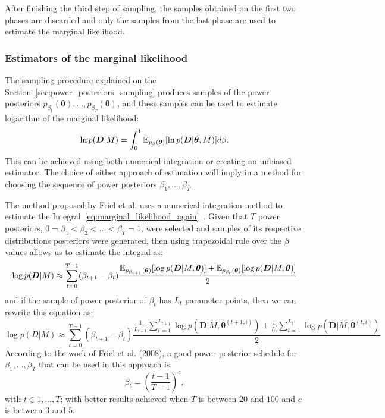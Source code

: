 After finishing the third step of sampling, the samples obtained on the
first two phases are discarded and only the samples from the last phase
are used to estimate the marginal likelihood.

\subsubsection{Estimators of the marginal likelihood}
The sampling procedure explained on the 
Section~\ref{sec:power_posteriors_sampling} produces samples of the 
power posteriors $p_{\beta_1} ({\bm \theta}), \ldots, p_{\beta_T} ({\bm
\theta})$, and these samples can be used to estimate logarithm of the 
marginal likelihood:
\begin{equation}
    \ln p ({\bm D} | M) = \int_0^1 \mathbb{E}_{p_\beta ({\bm \theta})} 
        [\ln p({\bm D}|{\bm \theta}, M)]d\beta.
    \label{eq:marginal_likelihood_again}
\end{equation}
This can be achieved using both numerical integration or creating an
unbiased estimator. The choice of either approach of estimation will
imply in a method for choosing the sequence of power posteriors 
$\beta_1, \ldots, \beta_T$. 

The method proposed by Friel et al. uses a numerical integration 
method to estimate the Integral~\ref{eq:marginal_likelihood_again}~\cite{Friel2008}. 
Given that $T$ power posteriors, $0 = \beta_1 < \beta_2 < \ldots <
\beta_T = 1$, were selected and samples of its respective distributions
posteriors were generated, then using trapezoidal rule over the $\beta$
values allows us to estimate the integral as:
\begin{equation}
    \log{p({\bm D}| M)} \approx \sum_{t = 0}^{T - 1} (\beta_{t + 1} -
    \beta_t)
\frac{
    \mathbb{E}_{p_{\beta_{t + 1}} ({\bm \theta})}[\log p({\bm D} | M,
    {\bm \theta})]
+ 
    \mathbb{E}_{p_{\beta_{t}} ({\bm \theta})}[\log p({\bm D} | M,
    {\bm \theta})]}
{2}
\end{equation}
and if the sample of power posterior of $\beta_t$ has $L_t$ parameter 
points, then we can rewrite this equation as:
\begin{equation}
\log{p(D| M)} \approx \sum_{t = 0}^{T - 1} (\beta_{t + 1} - \beta_t)
\frac{
    \frac{1}{L_{t + 1}}
    \sum_{i = 1}^{L_{t + 1}}  \log p({\bm D} | M, {\bm \theta}^{(t + 1,
    i)})
+ 
    \frac{1}{L_t}
    \sum_{i = 1}^{L_t}  \log p({\bm D} | M, {\bm \theta}^{(t, i)})}
{2}
    \label{eq:marginal_likelihood_trapezoidal_approximation}
\end{equation}
According to the work of Friel et al. (2008), a good power posterior 
schedule for $\beta_1, \ldots, \beta_T$ that can be used in this 
approach is:
\begin{equation}
    \beta_t = \left(\frac{t - 1}{T - 1}\right)^{c}, 
\end{equation}
with $t \in {1, \ldots, T}$; with better results achieved when $T$ is
between $20$ and $100$ and $c$ is between $3$ and $5$.

